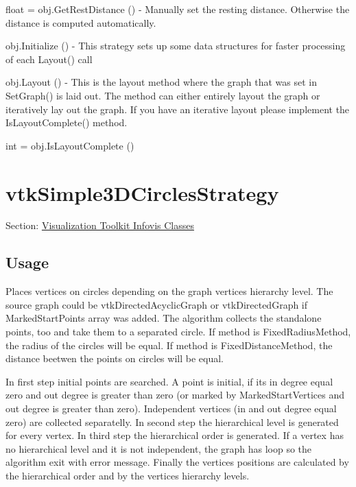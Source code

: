 \begin{DoxyItemize}
\item {\ttfamily float = obj.\-Get\-Rest\-Distance ()} -\/ Manually set the resting distance. Otherwise the distance is computed automatically.  
\item {\ttfamily obj.\-Initialize ()} -\/ This strategy sets up some data structures for faster processing of each Layout() call  
\item {\ttfamily obj.\-Layout ()} -\/ This is the layout method where the graph that was set in Set\-Graph() is laid out. The method can either entirely layout the graph or iteratively lay out the graph. If you have an iterative layout please implement the Is\-Layout\-Complete() method.  
\item {\ttfamily int = obj.\-Is\-Layout\-Complete ()}  
\end{DoxyItemize}\hypertarget{vtkinfovis_vtksimple3dcirclesstrategy}{}\section{vtk\-Simple3\-D\-Circles\-Strategy}\label{vtkinfovis_vtksimple3dcirclesstrategy}
Section\-: \hyperlink{sec_vtkinfovis}{Visualization Toolkit Infovis Classes} \hypertarget{vtkwidgets_vtkxyplotwidget_Usage}{}\subsection{Usage}\label{vtkwidgets_vtkxyplotwidget_Usage}
Places vertices on circles depending on the graph vertices hierarchy level. The source graph could be vtk\-Directed\-Acyclic\-Graph or vtk\-Directed\-Graph if Marked\-Start\-Points array was added. The algorithm collects the standalone points, too and take them to a separated circle. If method is Fixed\-Radius\-Method, the radius of the circles will be equal. If method is Fixed\-Distance\-Method, the distance beetwen the points on circles will be equal.

In first step initial points are searched. A point is initial, if its in degree equal zero and out degree is greater than zero (or marked by Marked\-Start\-Vertices and out degree is greater than zero). Independent vertices (in and out degree equal zero) are collected separatelly. In second step the hierarchical level is generated for every vertex. In third step the hierarchical order is generated. If a vertex has no hierarchical level and it is not independent, the graph has loop so the algorithm exit with error message. Finally the vertices positions are calculated by the hierarchical order and by the vertices hierarchy levels.


